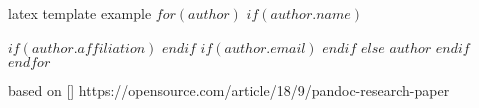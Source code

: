 latex template example
$for(author)$
    $if(author.name)$
        \author{$author.name$}
        $if(author.affiliation)$
        $endif$
        $if(author.email)$
        $endif$
    $else$
        $author$
    $endif$
$endfor$

based on [] https://opensource.com/article/18/9/pandoc-research-paper 


